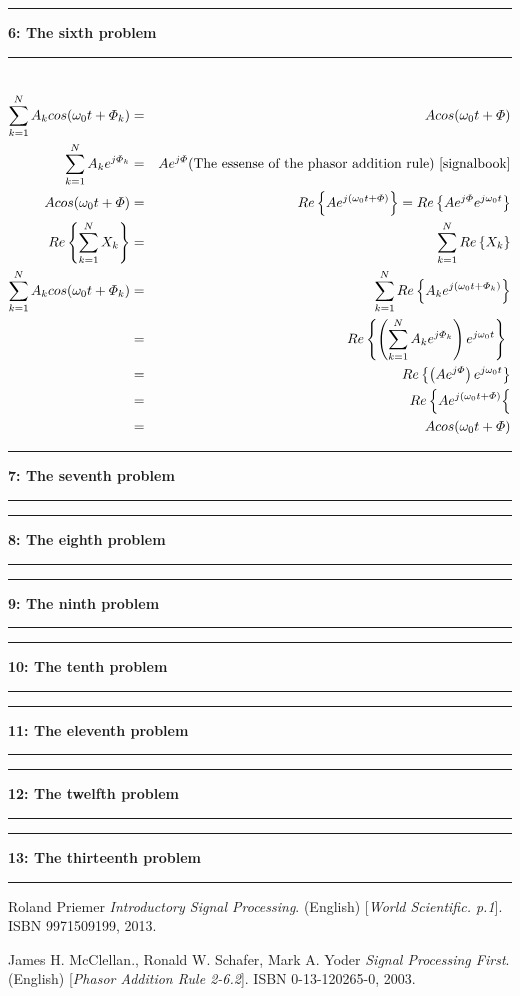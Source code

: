 \documentclass[11pt]{article}
\newcommand\question[2]{\vspace{.25in}\hrule\textbf{#1: #2}\vspace{.5em}\hrule\vspace{.10in}}
\begin{document}
\question{6}{The sixth problem}
\begin{eqnarray*} \\ 
	\sum_{k=1}^{N} A_k cos(\omega_0 t + \varPhi_k) &=&  A cos(\omega_0 t + \varPhi) \\
	\sum_{k=1}^{N} A_k e^{j \varPhi_k } &=&   A e^{j \varPhi } \text{(The essense of the phasor addition rule)}\  \cite{signalbook} \\
	A cos(\omega_0 t + \varPhi) &=& Re \left\{ A e^{j (\omega_0 t + \varPhi)}  \right\} =  Re \left\{ A e^{j \varPhi} e^{j \omega_0 t}  \right\} \\
	 Re \left\{ \sum_{k=1}^{N} X_k  \right\} &=& \sum_{k=1}^{N} Re \left\{ X_k \right\} \\
	 \sum_{k=1}^{N} A_k cos(\omega_0 t + \varPhi_k) &=& \sum_{k=1}^{N} Re \left\{ A_k e^{j (\omega_0 t + \varPhi_k)} \right\} \\
	&=& Re \left\{ \left( \sum_{k=1}^{N} A_k e^{j \varPhi_k } \right) e^{j\omega_0 t}  \right\} \\
	&=& Re \left\{ \left( A e^{j\varPhi} \right) e^{j\omega_0 t}  \right\} \\
	&=& Re \left\{ A e^{j (\omega_0 t + \varPhi)}  \right\{ \\
	&=& A cos(\omega_0 t + \varPhi) \\
\end{eqnarray*}

\question{7}{The seventh problem}

\question{8}{The eighth problem}

\question{9}{The ninth problem}

\question{10}{The tenth problem}

\question{11}{The eleventh problem}

\question{12}{The twelfth problem}

\question{13}{The thirteenth problem}

\begin{thebibliography}{1}
	Roland Priemer
	\textit{Introductory Signal Processing}. (English) 
	[\textit{World Scientific. p.1}]. ISBN 9971509199, 2013.
	
	James H. McClellan., Ronald W. Schafer, Mark A. Yoder
	\textit{Signal Processing First}. (English) 
	[\textit{Phasor Addition Rule 2-6.2}]. ISBN 0-13-120265-0, 2003.
\end{thebibliography}
\end{document}
